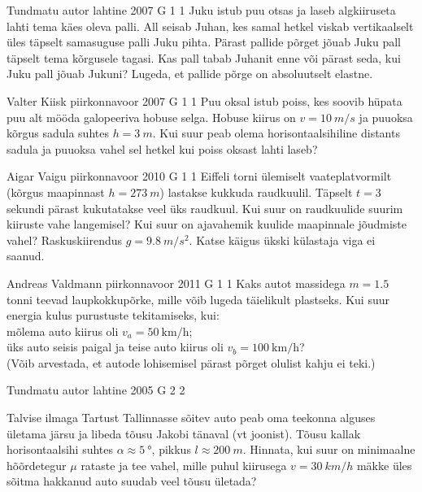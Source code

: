 \documentclass[11pt]{article}
\begin{document}
{%
{Tundmatu autor} %
{lahtine} %
{2007} %
{G 1} %
{1} %
{
\ifStatement
Juku istub puu otsas ja laseb algkiiruseta lahti tema käes oleva palli. All seisab Juhan, kes samal hetkel viskab vertikaalselt üles täpselt samasuguse palli Juku pihta. Pärast pallide põrget jõuab Juku pall täpselt tema kõrgusele tagasi. Kas pall tabab Juhanit enne või pärast seda, kui Juku pall jõuab Jukuni? Lugeda, et pallide põrge on absoluutselt elastne.
\fi
}

{Valter Kiisk} %
{piirkonnavoor} %
{2007} %
{G 1} %
{1} %
{
\ifStatement
Puu oksal istub poiss, kes soovib hüpata puu alt mööda galopeeriva hobuse selga. Hobuse kiirus on $v = \SI{10}{m/s}$ ja puuoksa kõrgus sadula suhtes $h = \SI{3}{m}$. Kui suur peab olema horisontaalsihiline distants sadula ja puuoksa vahel sel hetkel kui poiss oksast lahti laseb?
\fi
}

{Aigar Vaigu} %
{piirkonnavoor} %
{2010} %
{G 1} %
{1} %
{
\ifStatement
Eiffeli torni ülemiselt vaateplatvormilt (kõrgus maapinnast
$h=\SI{273}{m}$) lastakse kukkuda raudkuulil. Täpselt $t=3$ sekundi pärast kukutatakse
veel üks raudkuul. Kui suur on raudkuulide suurim
kiiruste vahe langemisel? Kui suur on ajavahemik kuulide maapinnale jõudmiste
vahel? Raskuskiirendus $g=\SI{9.8}{m/s^2}$. Katse käigus ükski külastaja viga ei saanud.
\fi
}

{Andreas Valdmann} %
{piirkonnavoor} %
{2011} %
{G 1} %
{1} %
{
\ifStatement
Kaks autot massidega $m=\SI{1,5}{}$ tonni teevad laupkokkupõrke, mille võib lugeda täielikult plastseks. Kui suur energia kulus purustuste tekitamiseks, kui:\\
\osa mõlema auto kiirus oli $v_a=\SI{50}{\kilo\metre\per\hour}$; \\
\osa üks auto seisis paigal ja teise auto kiirus oli $v_b=\SI{100}{\kilo\metre\per\hour}$?\\
(Võib arvestada, et autode lohisemisel pärast põrget olulist kahju ei teki.)
\fi
}

{Tundmatu autor} %
{lahtine} %
{2005} %
{G 2} %
{2} %
{
\ifStatement
Talvise ilmaga Tartust Tallinnasse sõitev auto peab oma teekonna alguses ületama järsu ja libeda tõusu Jakobi tänaval (vt joonist). Tõusu kallak horisontaalsihi suhtes $\alpha \approx \SI{5}{\degree}$, pikkus $l \approx \SI{200}{m}$. Hinnata, kui suur on minimaalne hõõrdetegur $\mu$ rataste ja tee vahel, mille puhul kiirusega $v = \SI{30}{km/h}$ mäkke üles sõitma hakkanud auto suudab veel tõusu ületada?

}}
\end{document}
